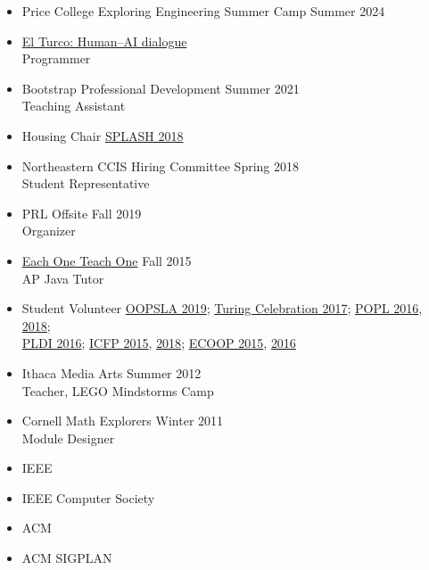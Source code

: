 \documentclass[11pt]{article}
\begin{document}
\begin{itemize}
  \item Price College Exploring Engineering Summer Camp \hfill Summer 2024
  \item \href{https://elturco.diemutstrebe.com}{El Turco: Human--AI dialogue} \hfill {} \\
    Programmer
  \item {Bootstrap Professional Development} \hfill {Summer 2021}\\
        Teaching Assistant
  \item {Housing Chair} \hfill \href{https://2018.splashcon.org/committee/splash-2018-organizing-committee}{SPLASH 2018}
  \item {Northeastern CCIS Hiring Committee} \hfill {Spring 2018}\\
    Student Representative
  \item {PRL Offsite} \hfill {Fall 2019}\\
    Organizer
  \item \href{https://www.eachoneteachone.is}{Each One Teach One} \hfill {Fall 2015}\\
    AP Java Tutor
  \item {Student Volunteer} \hfill \href{https://2019.splashcon.org/}{OOPSLA 2019}; \href{https://www.acm.org/turing-award-50/conference}{Turing Celebration 2017}; \href{http://conf.researchr.org/home/POPL-2016}{POPL 2016}, \href{http://conf.researchr.org/home/POPL-2018}{2018};\\
    {\hbox{}\hfill{} \href{http://conf.researchr.org/home/PLDI-2016}{PLDI 2016}; \href{http://icfpconference.org/icfp2015/}{ICFP 2015}, \href{https://icfp18.sigplan.org/committee/icfp-2018-organizing-committee}{2018}; \href{http://2015.ecoop.org/}{ECOOP 2015}, \href{http://2016.ecoop.org/}{2016}}
  \item {Ithaca Media Arts} \hfill {Summer 2012}\\
    Teacher, LEGO Mindstorms Camp
  \item {Cornell Math Explorers} \hfill {Winter 2011}\\
    Module Designer

\end{itemize}



\begin{itemize}
  \item {IEEE} \hfill {}
  \item {IEEE Computer Society} \hfill {}
  \item {ACM} \hfill {}
  \item {ACM SIGPLAN} \hfill {}
\end{itemize}
\end{document}
